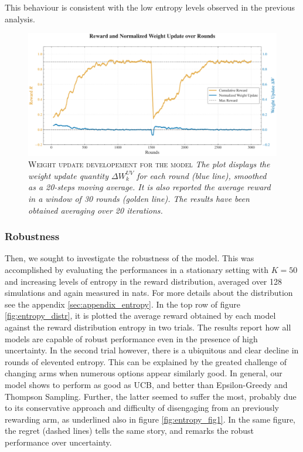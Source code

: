 This behaviour is consistent with the low entropy levels observed in the previous analysis.


\begin{figure}[H]
    \centering
    \includegraphics[width=1.0\textwidth]{figures/reward_update_plot.pdf}
    \caption{\textsc{Weight update developement for the model} \textit{The plot displays the weight update quantity $\Delta W_{k}^{UV}$ for each round (blue line), smoothed as a 20-steps moving average.
    It is also reported the average reward in a window of 30 rounds (golden line). The results have been obtained averaging over 20 iterations.}}
    \label{fig:rew_update}
\end{figure}


\subsubsection{Robustness}

\noindent Then, we sought to investigate the robustness of the model.
This was accomplished by evaluating the performances in a stationary setting with $K=50$ and increasing levels of entropy in the reward distribution, averaged over 128 simulations and again measured in nats.
For more details about the distribution see the appendix \ref{sec:appendix_entropy}.
In the top row of figure \ref{fig:entropy_distr}, it is plotted the average reward obtained by each model against the reward distribution entropy in two trials.
The results report how all models are capable of robust performance even in the presence of high uncertainty.
In the second trial however, there is a ubiquitous and clear decline in rounds of elevented entropy. This can be explained by the greated challenge of changing arms when numerous options appear similarly good.
In general, our model shows to perform as good as UCB, and better than Epsilon-Greedy and Thompson Sampling.
Further, the latter seemed to suffer the most, probably due to its conservative approach and difficulty of disengaging from an previously rewarding arm, as underlined also in figure \ref{fig:entropy_fig1}.
In the same figure, the regret (dashed lines) tells the same story, and remarks the robust performance over uncertainty.

